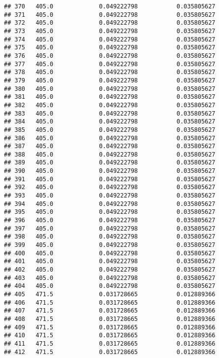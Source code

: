 \documentclass[]{article}
\begin{document}
\begin{verbatim}
## 370   405.0             0.049222798           0.035805627
## 371   405.0             0.049222798           0.035805627
## 372   405.0             0.049222798           0.035805627
## 373   405.0             0.049222798           0.035805627
## 374   405.0             0.049222798           0.035805627
## 375   405.0             0.049222798           0.035805627
## 376   405.0             0.049222798           0.035805627
## 377   405.0             0.049222798           0.035805627
## 378   405.0             0.049222798           0.035805627
## 379   405.0             0.049222798           0.035805627
## 380   405.0             0.049222798           0.035805627
## 381   405.0             0.049222798           0.035805627
## 382   405.0             0.049222798           0.035805627
## 383   405.0             0.049222798           0.035805627
## 384   405.0             0.049222798           0.035805627
## 385   405.0             0.049222798           0.035805627
## 386   405.0             0.049222798           0.035805627
## 387   405.0             0.049222798           0.035805627
## 388   405.0             0.049222798           0.035805627
## 389   405.0             0.049222798           0.035805627
## 390   405.0             0.049222798           0.035805627
## 391   405.0             0.049222798           0.035805627
## 392   405.0             0.049222798           0.035805627
## 393   405.0             0.049222798           0.035805627
## 394   405.0             0.049222798           0.035805627
## 395   405.0             0.049222798           0.035805627
## 396   405.0             0.049222798           0.035805627
## 397   405.0             0.049222798           0.035805627
## 398   405.0             0.049222798           0.035805627
## 399   405.0             0.049222798           0.035805627
## 400   405.0             0.049222798           0.035805627
## 401   405.0             0.049222798           0.035805627
## 402   405.0             0.049222798           0.035805627
## 403   405.0             0.049222798           0.035805627
## 404   405.0             0.049222798           0.035805627
## 405   471.5             0.031728665           0.012889366
## 406   471.5             0.031728665           0.012889366
## 407   471.5             0.031728665           0.012889366
## 408   471.5             0.031728665           0.012889366
## 409   471.5             0.031728665           0.012889366
## 410   471.5             0.031728665           0.012889366
## 411   471.5             0.031728665           0.012889366
## 412   471.5             0.031728665           0.012889366

\end{verbatim}
\end{document}
